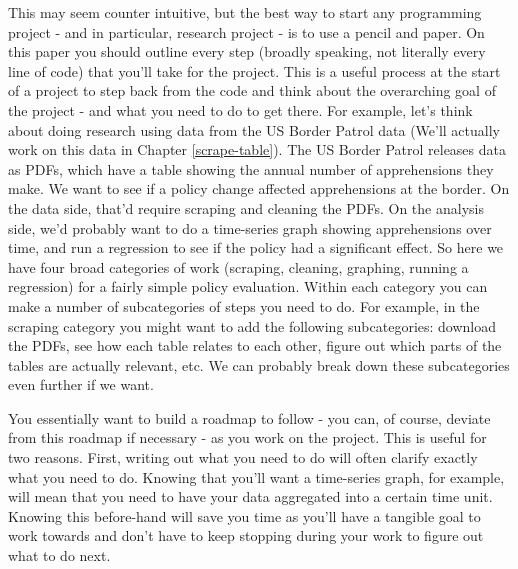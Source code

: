 \documentclass[
  a4paper,
]{krantz}
\begin{document}
This may seem counter intuitive, but the best way to start
any programming project - and in particular, research
project - is to use a pencil and paper. On this paper you
should outline every step (broadly speaking, not literally
every line of code) that you'll take for the project. This
is a useful process at the start of a project to step back
from the code and think about the overarching goal of the
project - and what you need to do to get there. For example,
let's think about doing research using data from the US
Border Patrol data (We'll actually work on this data in
Chapter \ref{scrape-table}). The US Border Patrol releases
data as PDFs, which have a table showing the annual number
of apprehensions they make. We want to see if a policy
change affected apprehensions at the border. On the data
side, that'd require scraping and cleaning the PDFs. On the
analysis side, we'd probably want to do a time-series graph
showing apprehensions over time, and run a regression to see
if the policy had a significant effect. So here we have four
broad categories of work (scraping, cleaning, graphing,
running a regression) for a fairly simple policy evaluation.
Within each category you can make a number of subcategories
of steps you need to do. For example, in the scraping
category you might want to add the following subcategories:
download the PDFs, see how each table relates to each other,
figure out which parts of the tables are actually relevant,
etc. We can probably break down these subcategories even
further if we want.

You essentially want to build a roadmap to follow - you can,
of course, deviate from this roadmap if necessary - as you
work on the project. This is useful for two reasons. First,
writing out what you need to do will often clarify exactly
what you need to do. Knowing that you'll want a time-series
graph, for example, will mean that you need to have your
data aggregated into a certain time unit. Knowing this
before-hand will save you time as you'll have a tangible
goal to work towards and don't have to keep stopping during
your work to figure out what to do next.
\end{document}

